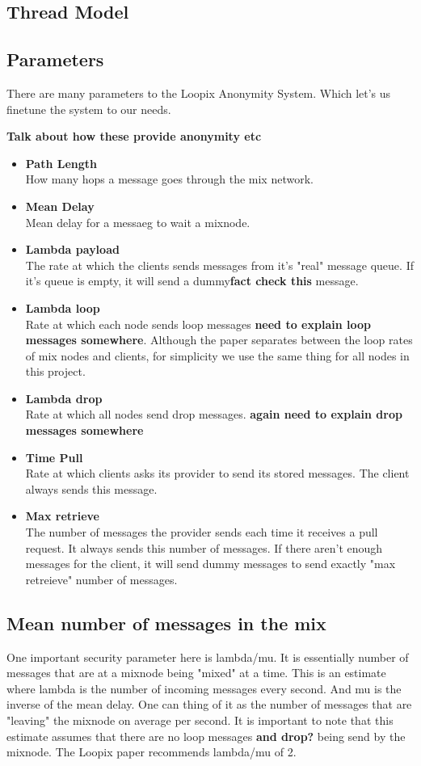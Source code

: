 \documentclass[a4paper,11pt,oneside]{report}
\begin{document}
\subsection{Thread Model}


\subsection{Parameters}
There are many parameters to the Loopix Anonymity System. Which let's us finetune the system to our needs.

\textbf{Talk about how these provide anonymity etc}
\begin{itemize}
\item \textbf{Path Length} \\
How many hops a message goes through the mix network.
\item \textbf{Mean Delay} \\
Mean delay for a messaeg to wait a mixnode.
\item \textbf{Lambda payload} \\
The rate at which the clients sends messages from it's "real" message queue. If it's queue is empty, it will send a dummy\textbf{fact check this} message.
\item \textbf{Lambda loop} \\ 
Rate at which each node sends loop messages \textbf{need to explain loop messages somewhere}. Although the paper separates between the loop rates of mix nodes and clients, for simplicity we use the same thing for all nodes in this project.
\item \textbf{Lambda drop} \\
Rate at which all nodes send drop messages. \textbf{again need to explain drop messages somewhere}
\item \textbf{Time Pull} \\
Rate at which clients asks its provider to send its stored messages. The client always sends this message.
\item \textbf{Max retrieve} \\
The number of messages the provider sends each time it receives a pull request. It always sends this number of messages. If there aren't enough messages for the client, it will send dummy messages to send exactly "max retreieve" number of messages.
\end{itemize}

\subsection{Mean number of messages in the mix}
One important security parameter here is lambda/mu. It is essentially number of messages that are at a mixnode being "mixed" at a time. This is an estimate where lambda is the number of incoming messages every second. And mu is the inverse of the mean delay. One can thing of it as the number of messages that are "leaving" the mixnode on average per second. It is important to note that this estimate assumes that there are no loop messages \textbf{and drop?} being send by the mixnode. The Loopix paper recommends lambda/mu of 2. 
\end{document}
